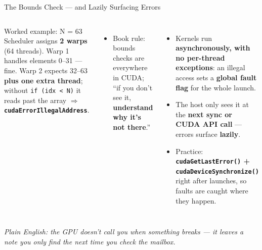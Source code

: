 \documentclass[aspectratio=169]{beamer}
\newcommand{\kw}[1]{\textbf{\textcolor{kwblue}{#1}}}
\newcommand{\pe}[1]{\par{\setlength{\fboxsep}{2.5pt}\noindent\colorbox{navy!9}{\parbox{\dimexpr\textwidth-5pt\relax}{\footnotesize\itshape Plain English: #1}}}}
\begin{document}
\begin{frame}{The Bounds Check --- and Lazily Surfacing Errors}
  \begin{columns}[t]
    \begin{block}{Worked example: N = 63}
      \small Scheduler assigns \kw{2 warps} (64 threads). Warp 1 handles elements 0--31 --- fine.
      Warp 2 expects 32--63 \kw{plus one extra thread}; without \texttt{if (idx < N)} it reads
      past the array $\Rightarrow$ \kw{\texttt{cudaErrorIllegalAddress}}.
    \end{block}
    \begin{itemize}\small
      \item Book rule: bounds checks are everywhere in CUDA; ``if you don't see it,
            \kw{understand why it's not there}.''
    \end{itemize}
    \begin{itemize}
      \item Kernels run \kw{asynchronously, with no per-thread exceptions}: an illegal access sets a
            \kw{global fault flag} for the whole launch.
      \item The host only sees it at the \kw{next sync or CUDA API call} --- errors surface
            \kw{lazily}.
      \item Practice: \kw{\texttt{cudaGetLastError()} + \texttt{cudaDeviceSynchronize()}}
            right after launches, so faults are caught where they happen.
    \end{itemize}
  \end{columns}
  \pe{the GPU doesn't call you when something breaks --- it leaves a note you only find the next time you check the mailbox.}
\end{frame}
\end{document}
